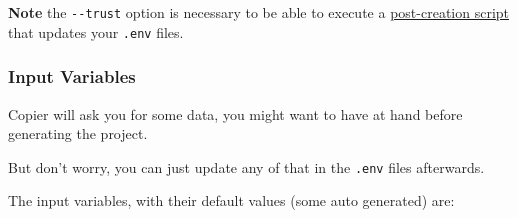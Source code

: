 \begin{Shaded}
\begin{Highlighting}[]
\end{Highlighting}
\end{Shaded}

\textbf{Note} the \texttt{-\/-trust} option is necessary to be able to
execute a
\href{https://github.com/tiangolo/full-stack-fastapi-template/blob/master/.copier/update_dotenv.py}{post-creation
script} that updates your \texttt{.env} files.

\hypertarget{input-variables}{%
\subsubsection{Input Variables}\label{input-variables}}

Copier will ask you for some data, you might want to have at hand before
generating the project.

But don't worry, you can just update any of that in the \texttt{.env}
files afterwards.

The input variables, with their default values (some auto generated)
are:

